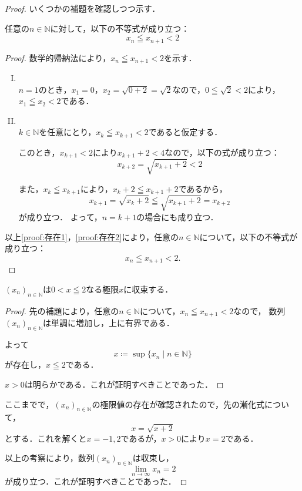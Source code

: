 \begin{tleftbar}
  \begin{proof}
    いくつかの補題を確認しつつ示す．
    \begin{lemma}{}{}
      任意の$n \in \mathbb{N}$に対して，以下の不等式が成り立つ：
      \[
        x_n \leqq x_{n+1} < 2
      \]
    \end{lemma}
      \begin{proof}
        数学的帰納法により，$x_n \leqq x_{n+1} < 2$を示す．
        \begin{enumerate}[(I)]
          \item \mbox{} \\ \label{proof:存在1}
                $n=1$のとき，$ x_1 =0$，$x_2= \sqrt{0+2}=\sqrt{2}$なので，$ 0 \leqq \sqrt{2} < 2$により，
                $x_1 \leqq x_2 < 2$である．
          \item \mbox{} \\ \label{proof:存在2}
                $k \in \mathbb{N}$を任意にとり，$x_k \leqq x_{k+1} < 2$であると仮定する．

                このとき，$x_{k+1} < 2$により$ x_{k+1}+2 < 4$なので，以下の式が成り立つ：
                \[
                  x_{k+2}=\sqrt{x_{k+1} + 2} < 2
                \]

                また，$x_k \leqq x_{k+1}$により，$x_k +2  \leqq x_{k+1}+2$であるから，
                \[
                  x_{k+1}= \sqrt{x_k +2} \leqq \sqrt{x_{k+1}+2}=x_{k+2}
                \]
                が成り立つ．
                よって，$n=k+1$の場合にも成り立つ．
        \end{enumerate}
        以上\ref{proof:存在1}，\ref{proof:存在2}により，任意の$n \in \mathbb{N}$について，以下の不等式が成り立つ：
        \[
          x_n \leqq x_{n+1} < 2.
        \]
      \end{proof}
    \begin{lemma}{}{}
      $(x_n)_{n \in \mathbb{N}}$は$ 0<  x \leqq 2$なる極限$x$に収束する．
    \end{lemma}
      \begin{proof}
        先の補題により，任意の$n \in \mathbb{N}$について，$ x_n \leqq x_{n+1} <2$なので，
        数列$(x_n)_{n \in \mathbb{N}}$は単調に増加し，上に有界である．

        よって
        \[
          x \coloneqq \sup \{ x_n \mid n \in \mathbb{N} \}
        \]
        が存在し，$x \leqq  2$である．

        $ x>0$は明らかである．これが証明すべきことであった．
      \end{proof}

    ここまでで，$(x_n)_{n \in \mathbb{N}}$の極限値の存在が確認されたので，先の漸化式について，
    \[
      x=\sqrt{x+2}
    \]
    とする．これを解くと$ x= -1,2$であるが，$x>0$により$x=2$である．

    以上の考察により，数列$(x_n)_{n \in \mathbb{N}}$は収束し，
    \[
      \lim_{n \to \infty} x_n =2
    \]
    が成り立つ．これが証明すべきことであった．
  \end{proof}
\end{tleftbar}

